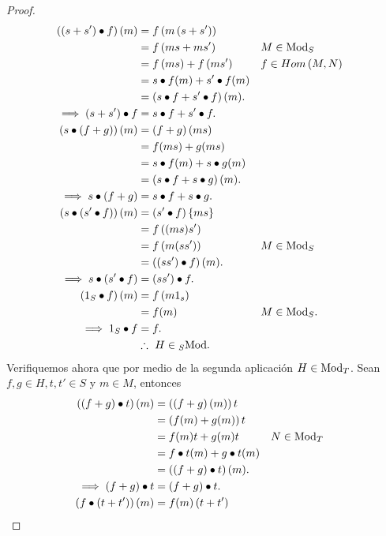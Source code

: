 \documentclass{article}
\newcommand{\lrprth}[1]{
	\left(#1\right)
}
\newcommand{\lrbrack}[1]{
	\left\{#1\right\}
}
\newcommand{\ringmod}[3]{
	\if#3l
	{}_{#1}#2
	\else
	\if#3r
	#2_{#1}
	\fi
	\fi
}
\theoremstyle{definition}
\theoremstyle{plain}
\theoremstyle{plain}
\theoremstyle{definition}
\theoremstyle{definition}
\theoremstyle{definition}
\theoremstyle{definition}
\theoremstyle{definition}
\theoremstyle{definition}
\begin{document}
\begin{enumerate}[label=\textbf{Ej \arabic*.}]
\begin{proof}
	\begin{align*}
		\lrprth{\lrprth{s+s'}\bullet f}(m)&=f\lrprth{m\lrprth{s+s'}}\\
		&=f\lrprth{ms+ms'} && M\in\ringmod{S}{\text{Mod}}{r}\\
		&=f\lrprth{ms}+f\lrprth{ms'} && f\in Hom\lrprth{M,N}\\
		&=s\bullet f (m)+s'\bullet f (m)\\
		&=\lrprth{s\bullet f+ s'\bullet f}(m).\\
		\implies \lrprth{s+s'}\bullet f&= s\bullet f+ s'\bullet f.\\
		\lrprth{s\bullet\lrprth{f+g}}(m)&=\lrprth{f+g}\lrprth{ms}\\
		&=f(ms)+g(ms)\\
		&=s\bullet f (m)+ s\bullet g (m)\\
		&=\lrprth{s\bullet f+ s\bullet g }(m).\\
		\implies s\bullet\lrprth{f+g}&= s\bullet f+ s\bullet g.\\
		\lrprth{s\bullet\lrprth{s'\bullet f}}(m)&=\lrprth{s'\bullet f}\lrbrack{ms}\\
		&=f\lrprth{(ms)s'}\\
		&=f\lrprth{m(ss')} && M\in\ringmod{S}{\text{Mod}}{r}\\
		&=\lrprth{\lrprth{ss'}\bullet f}(m).\\
		\implies s\bullet\lrprth{s'\bullet f}&= \lrprth{ss'}\bullet f.\\
		\lrprth{1_S\bullet f}(m)&=f\lrprth{m1_s}\\
		&=f(m) && M\in\ringmod{S}{\text{Mod}}{r}.\\
		\implies 1_S\bullet f&= f.\\
		&\therefore\ H\in\ringmod{S}{\text{Mod}}{l}.
	\end{align*} 
	Verifiquemos ahora que por medio de la segunda aplicación $H\in\ringmod{T}{\text{Mod}}{r}$. Sean $f,g\in H, t,t'\in S$ y $m\in M$, entonces
	\begin{align*}
		\lrprth{\lrprth{f+g}\bullet t}(m)&=\lrprth{\lrprth{f+g}(m)}t\\
		&=\lrprth{f(m)+g(m)}t\\
		&=f(m)t+g(m)t && N\in\ringmod{T}{\text{Mod}}{r}\\
		&=f\bullet t(m)+g\bullet t(m)\\
		&=\lrprth{\lrprth{f+g}\bullet t}(m).\\
		\implies \lrprth{f+g}\bullet t&= \lrprth{f+g}\bullet t.\\
		\lrprth{f\bullet\lrprth{t+t'}}(m)&=f(m)\lrprth{t+t'}\\

\end{align*}
\end{proof}
\end{enumerate}
\end{document}
